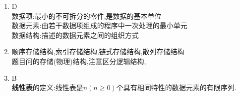 \documentclass[12pt, a4paper, oneside, UTF8]{ctexbook}
\begin{document}
\begin{enumerate}
    \item D  \\
    数据项:最小的不可拆分的零件,是数据的基本单位 \\
    数据元素:由若干数据项组成的程序中一次处理的最小单元 \\
    数据结构:描述的数据元素之间的组织方式

    \item 顺序存储结构,索引存储结构,链式存储结构,散列存储结构 \\
    题目问的存储(物理)结构,注意区分逻辑结构,

    \item B \\
    \textbf{线性表}的定义:线性表是$n(n\geq 0)$个具有相同特性的数据元素的有限序列. 


\end{enumerate}
\end{document}
